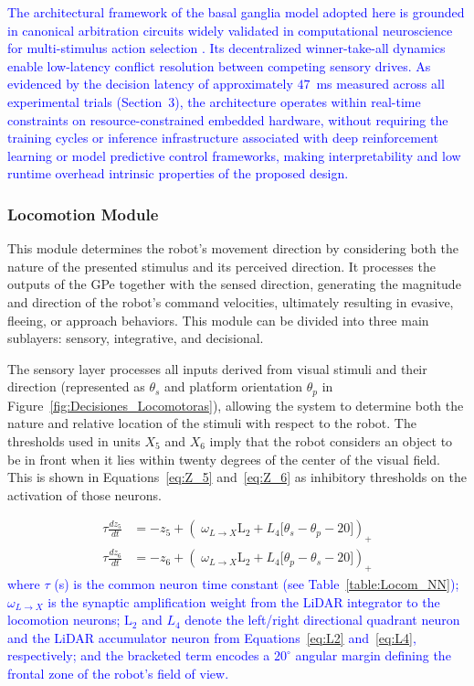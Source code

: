 \documentclass[preprint,12pt]{elsarticle}
\newcommand{\revblue}[1]{\textcolor{blue}{#1}}
\begin{document}
\revblue{The architectural framework of the basal ganglia model adopted here is grounded in canonical arbitration circuits widely validated in computational neuroscience for multi-stimulus action selection \citep{Gurney2001a,Gurney2001b,Prescott2006Robot}. Its decentralized winner-take-all dynamics enable low-latency conflict resolution between competing sensory drives. As evidenced by the decision latency of approximately $47$~ms measured across all experimental trials (Section~3), the architecture operates within real-time constraints on resource-constrained embedded hardware, without requiring the training cycles or inference infrastructure associated with deep reinforcement learning or model predictive control frameworks, making interpretability and low runtime overhead intrinsic properties of the proposed design.}

\subsubsection{Locomotion Module}

This module determines the robot’s movement direction by considering both the nature of the presented stimulus and its perceived direction. It processes the outputs of the GPe together with the sensed direction, generating the magnitude and direction of the robot’s command velocities, ultimately resulting in evasive, fleeing, or approach behaviors. This module can be divided into three main sublayers: sensory, integrative, and decisional. 

The sensory layer processes all inputs derived from visual stimuli and their direction (represented as $\theta_s$ and platform orientation $\theta_p$ in Figure~\ref{fig:Decisiones_Locomotoras}), allowing the system to determine both the nature and relative location of the stimuli with respect to the robot. The thresholds used in units $X_5$ and $X_6$ imply that the robot considers an object to be in front when it lies within twenty degrees of the center of the visual field. This is shown in Equations~\eqref{eq:Z_5} and~\eqref{eq:Z_6} as inhibitory thresholds on the activation of those neurons.

\begin{align}
\tau \frac{dz_5}{dt} &= -z_5 +
\left(\; \omega_{L \rightarrow X}   \text{L}_{2} +
{L}_{4}   \big[\theta_s - \theta_p - 20\big] \right)_+
\label{eq:Z_5}\\
\tau \frac{dz_6}{dt} &= -z_6 +
\left(\; \omega_{L \rightarrow X}   \text{L}_{2} +
{L}_{4}   \big[\theta_p - \theta_s - 20\big] \right)_+
\label{eq:Z_6}
\end{align}
\revblue{where $\tau$ (s) is the common neuron time constant (see Table~\ref{table:Locom_NN}); $\omega_{L\rightarrow X}$ is the synaptic amplification weight from the LiDAR integrator to the locomotion neurons; $\text{L}_2$ and $L_4$ denote the left/right directional quadrant neuron and the LiDAR accumulator neuron from Equations~\eqref{eq:L2} and~\eqref{eq:L4}, respectively; and the bracketed term encodes a $20^\circ$ angular margin defining the frontal zone of the robot's field of view.}
\end{document}
